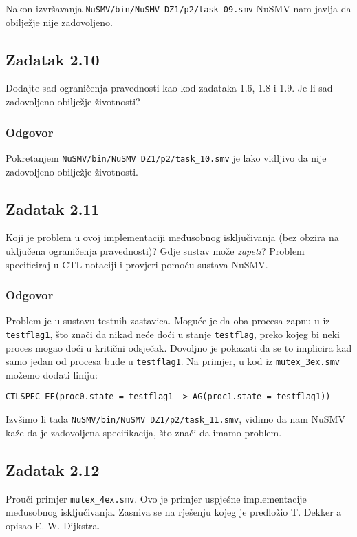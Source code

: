 \documentclass{article}
\newcommand{\code}[1]{\colorbox{blue!15}{\texttt{#1}}}
\newcommand{\odgovor}{\subsubsection*{Odgovor}}
\newcommand{\zadatak}[1]{\subsection{Zadatak #1}}
\begin{document}
\noindent
Nakon izvršavanja \code{NuSMV/bin/NuSMV DZ1/p2/task\_09.smv} NuSMV nam javlja da obilježje nije zadovoljeno.


\zadatak{2.10}

Dodajte sad ograničenja pravednosti kao kod zadataka 1.6, 1.8 i 1.9. Je li sad zadovoljeno obilježje životnosti?

\odgovor

Pokretanjem \code{NuSMV/bin/NuSMV DZ1/p2/task\_10.smv} je lako vidljivo da nije zadovoljeno obilježje životnosti.


\zadatak{2.11}

Koji je problem u ovoj implementaciji međusobnog isključivanja (bez obzira na uključena ograničenja pravednosti)? Gdje sustav može \emph{zapeti}? Problem specificiraj u CTL notaciji i provjeri pomoću sustava NuSMV.

\odgovor

Problem je u sustavu testnih zastavica. Moguće je da oba procesa zapnu u iz \code{testflag1}, što znači da nikad neće doći u stanje \code{testflag}, preko kojeg bi neki proces mogao doći u kritični odsječak. Dovoljno je pokazati da se to implicira kad samo jedan od procesa bude u \code{testflag1}. Na primjer, u kod iz \code{mutex\_3ex.smv} možemo dodati liniju:

\begin{verbatim}
CTLSPEC EF(proc0.state = testflag1 -> AG(proc1.state = testflag1))
\end{verbatim}

\noindent
Izvšimo li tada \code{NuSMV/bin/NuSMV DZ1/p2/task\_11.smv}, vidimo da nam NuSMV kaže da je zadovoljena specifikacija, što znači da imamo problem.
\pagebreak  %


\zadatak{2.12}

Prouči primjer \code{mutex\_4ex.smv}. Ovo je primjer uspješne implementacije međusobnog isključivanja. Zasniva se na rješenju kojeg je predložio T. Dekker a opisao E. W. Dijkstra. 
\end{document}

